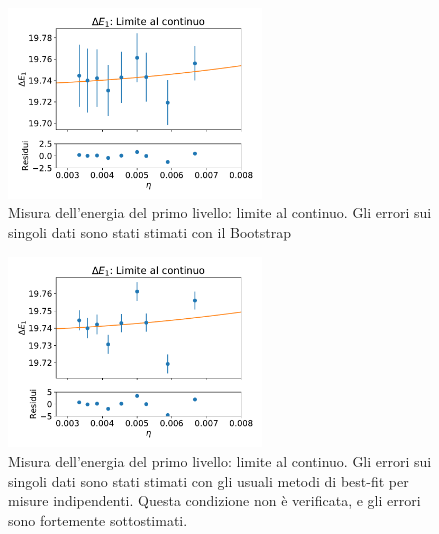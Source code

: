 \documentclass[a4paper,11pt]{article}
\begin{document}
    \begin{figure}[h!]
        \centering
        \includegraphics[width=0.6\textwidth]{figure/energy_continuum_5.pdf}
        \caption{Misura dell'energia del primo livello: limite al continuo. Gli errori sui singoli dati sono stati stimati con il Bootstrap}
        \label{fig:energy_continuum}
    \end{figure}
    
    \begin{figure}[h!]
        \centering
        \includegraphics[width=0.6\textwidth]{figure/energy_continuum_5_wrong.pdf}
        \caption{Misura dell'energia del primo livello: limite al continuo. Gli errori sui singoli dati sono stati stimati con gli usuali metodi di best-fit per misure indipendenti. Questa condizione non è verificata, e gli errori sono fortemente sottostimati.}
        \label{fig:energy_continuum_wrong}
    \end{figure}



    

    
\end{document}
